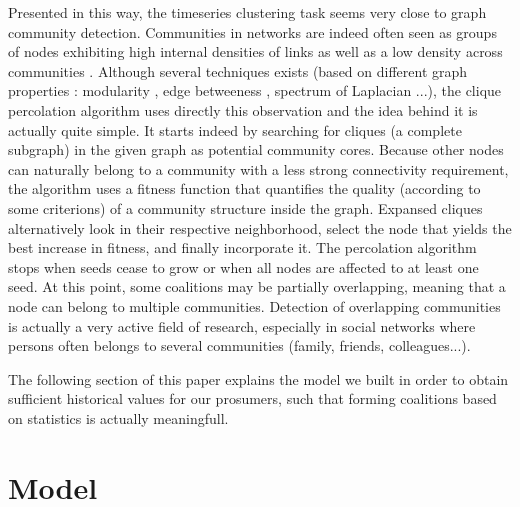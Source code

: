 \documentclass[conference]{IEEEtran}
\begin{document}
Presented in this way, the timeseries clustering task seems very close to graph community detection. Communities in networks are indeed often seen as groups of nodes exhibiting high internal densities of links as well as a low density across communities \cite{Newmanb}. Although several techniques exists (based on different graph properties : modularity \cite{Newmanb}, edge betweeness \cite{Girvan2002}, spectrum of Laplacian \cite{Newman}...), the clique percolation algorithm \cite{Lancichinetti} uses directly this observation and the idea behind it is actually quite simple. It starts indeed by searching for cliques (a complete subgraph) in the given graph as potential community cores. Because other nodes can naturally belong to a community with a less strong connectivity requirement, the algorithm uses a fitness function that quantifies the quality (according to some criterions) of a community structure inside the graph. Expansed cliques alternatively look in their respective neighborhood, select the node that yields the best increase in fitness, and finally incorporate it. The percolation algorithm stops when seeds cease to grow or when all nodes are affected to at least one seed. At this point, some coalitions may be partially overlapping, meaning that a node can belong to multiple communities. Detection of overlapping communities is actually a very active field of research, especially in social networks where persons often belongs to several communities (family, friends, colleagues...).

The following section of this paper explains the model we built in order to obtain sufficient historical values for our prosumers, such that forming coalitions based on statistics is actually meaningfull. 

\section{Model}
\label{sec:model}
\end{document}
